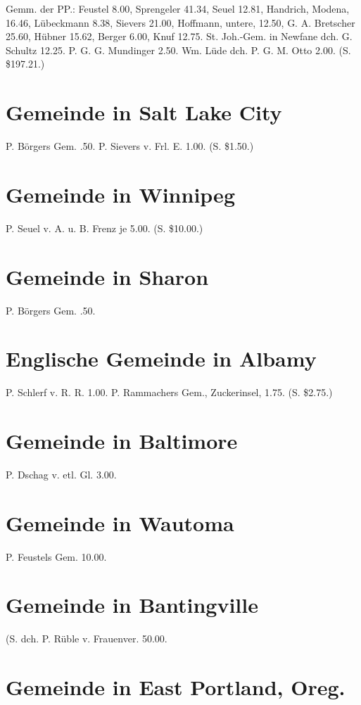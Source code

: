 Gemm. der PP.: Feustel 8.00, Sprengeler 41.34, Seuel 12.81, Handrich, Modena, 16.46, Lübeckmann 8.38, Sievers 21.00, Hoffmann, untere, 12.50, G. A. Bretscher 25.60, Hübner 15.62, Berger 6.00, Knuf 12.75. St. Joh.-Gem. in Newfane dch. G. Schultz 12.25. P. G. G. Mundinger 2.50. Wm. Lüde dch. P. G. M. Otto 2.00. (S. \$197.21.)

\section{Gemeinde in Salt Lake City}

P. Börgers Gem. .50. P. Sievers v. Frl. E. 1.00. (S. \$1.50.)

\section{Gemeinde in Winnipeg}

P. Seuel v. A. u. B. Frenz je 5.00. (S. \$10.00.)

\section{Gemeinde in Sharon}

P. Börgers Gem. .50.

\section{Englische Gemeinde in Albamy}

P. Schlerf v. R. R. 1.00. P. Rammachers Gem., Zuckerinsel, 1.75. (S. \$2.75.)

\section{Gemeinde in Baltimore}

P. Dschag v. etl. Gl. 3.00.

\section{Gemeinde in Wautoma}

P. Feustels Gem. 10.00.

\section{Gemeinde in Bantingville}

(S. dch. P. Rüble v. Frauenver. 50.00.

\section{Gemeinde in East Portland, Oreg.}

